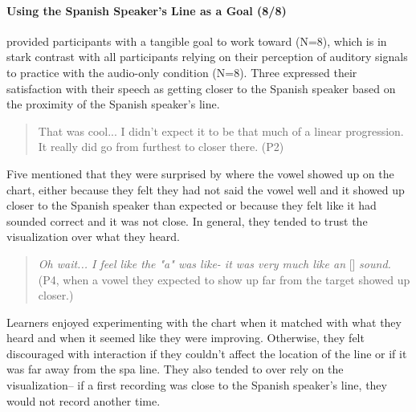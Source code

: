\paragraph{Using the Spanish Speaker's Line as a Goal (8/8)}
\visowel{} provided participants with a tangible goal to work toward (N=8), which is in stark contrast with all participants relying on their perception of auditory signals to practice with the audio-only condition (N=8). Three expressed their satisfaction with their speech as getting closer to the Spanish speaker based on the proximity of the Spanish speaker's line. 
\begin{quote}
    That was cool... I didn't expect it to be that much of a linear progression. It really did go from furthest to closer there. (P2)
\end{quote}
Five mentioned that they were surprised by where the vowel showed up on the chart, either because they felt they had not said the vowel well and it showed up closer to the Spanish speaker than expected or because they felt like it had sounded correct and it was not close. In general, they tended to trust the visualization over what they heard. 
\begin{quote}
    \textit{Oh wait... I feel like the "a" was like- it was very much like an} [] \textit{sound.} (P4, when a vowel they expected to show up far from the target showed up closer.)
\end{quote}
Learners enjoyed experimenting with the chart when it matched with what they heard and when it seemed like they were improving. Otherwise, they felt discouraged with interaction if they couldn't affect the location of the line or if it was far away from the spa line. They also tended to over rely on the visualization-- if a first recording was close to the Spanish speaker's line, they would not record another time. 


